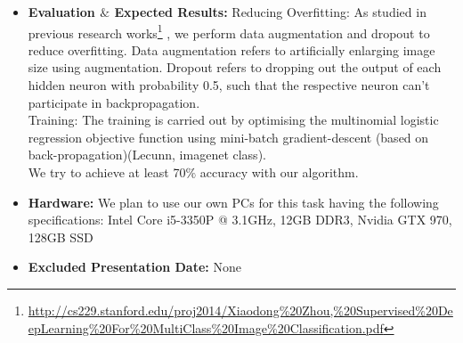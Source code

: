 \documentclass[10pt,a4]{article}
\begin{document}
\begin{itemize}
	\newpage
	\item \textbf{Evaluation $\mathbf{\&}$ Expected  Results:} Reducing Overfitting: As studied in previous research works\footnote{\url{http://cs229.stanford.edu/proj2014/Xiaodong\%20Zhou,\%20Supervised\%20DeepLearning\%20For\%20MultiClass\%20Image\%20Classification.pdf}} , we perform data augmentation and dropout to reduce overfitting. Data augmentation refers to artificially enlarging image size using augmentation. Dropout refers to dropping out the output of each hidden neuron with probability 0.5, such that the respective neuron can't participate in backpropagation. 
	\\Training: The training is carried out by optimising the multinomial logistic regression objective function using mini-batch gradient-descent (based on back-propagation)(Lecunn, imagenet class).
	\\We try to achieve at least 70$\%$ accuracy with our algorithm.
	
	\item \textbf{Hardware:} We plan to use our own PCs for this task having the following specifications:
	Intel Core i5-3350P @ 3.1GHz, 12GB DDR3, Nvidia GTX 970, 128GB SSD
	
	\item \textbf{Excluded Presentation Date:} None
\end{itemize}
\end{document}
